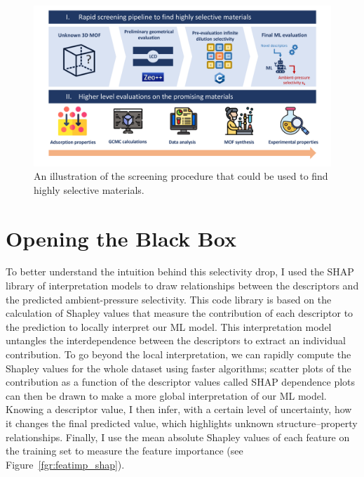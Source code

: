 \documentclass[main]{subfiles}
\begin{document}
\begin{figure}[ht]
\centering
  \includegraphics[width=0.99\linewidth]{figures/4-ml/main/pipeline.pdf}
  \caption{An illustration of the screening procedure that could be used to find highly selective materials.}\label{fgr:pipeline}
\end{figure}

\section{Opening the Black Box}

To better understand the intuition behind this selectivity drop, I used the SHAP\autocite{SHAP,molnar2020interpretable} library of interpretation models to draw relationships between the descriptors and the predicted ambient-pressure selectivity. This code library is based on the calculation of Shapley values\autocite{shapley1953value} that measure the contribution of each descriptor to the prediction to locally interpret our ML model. This interpretation model untangles the interdependence between the descriptors to extract an individual contribution. To go beyond the local interpretation, we can rapidly compute the Shapley values for the whole dataset using faster algorithms;\autocite{SHAP} scatter plots of the contribution as a function of the descriptor values called SHAP dependence plots can then be drawn to make a more global interpretation of our ML model. Knowing a descriptor value, I then infer, with a certain level of uncertainty, how it changes the final predicted value, which highlights unknown structure--property relationships. Finally, I use the mean absolute Shapley values of each feature on the training set to measure the feature importance (see Figure~\ref{fgr:featimp_shap}).
\end{document}
